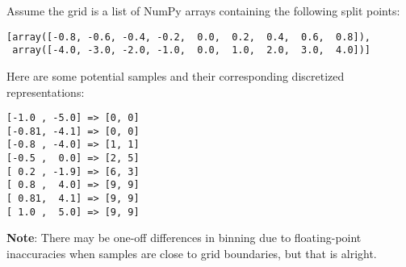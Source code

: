 \documentclass[11pt]{article}
\begin{document}
Assume the grid is a list of NumPy arrays containing the following split
points:

\begin{verbatim}
[array([-0.8, -0.6, -0.4, -0.2,  0.0,  0.2,  0.4,  0.6,  0.8]),
 array([-4.0, -3.0, -2.0, -1.0,  0.0,  1.0,  2.0,  3.0,  4.0])]
\end{verbatim}

Here are some potential samples and their corresponding discretized
representations:

\begin{verbatim}
[-1.0 , -5.0] => [0, 0]
[-0.81, -4.1] => [0, 0]
[-0.8 , -4.0] => [1, 1]
[-0.5 ,  0.0] => [2, 5]
[ 0.2 , -1.9] => [6, 3]
[ 0.8 ,  4.0] => [9, 9]
[ 0.81,  4.1] => [9, 9]
[ 1.0 ,  5.0] => [9, 9]
\end{verbatim}

\textbf{Note}: There may be one-off differences in binning due to
floating-point inaccuracies when samples are close to grid boundaries,
but that is alright.
\end{document}
